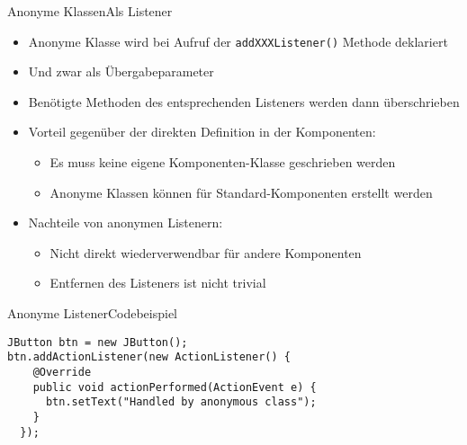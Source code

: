 \begin{frame}{Anonyme Klassen}{Als Listener}
    \begin{itemize}
        \item Anonyme Klasse wird bei Aufruf der \texttt{addXXXListener()} Methode deklariert
        \item Und zwar als Übergabeparameter
        \item Benötigte Methoden des entsprechenden Listeners werden dann überschrieben
        \item Vorteil gegenüber der direkten Definition in der Komponenten:
        \begin{itemize}
            \item Es muss keine eigene Komponenten-Klasse geschrieben werden
            \item Anonyme Klassen können für Standard-Komponenten erstellt werden
        \end{itemize}
        \item Nachteile von anonymen Listenern:
        \begin{itemize}
            \item Nicht direkt wiederverwendbar für andere Komponenten
            \item Entfernen des Listeners ist nicht trivial
        \end{itemize}
    \end{itemize}
\end{frame}

\begin{frame}[fragile]{Anonyme Listener}{Codebeispiel}
\lstset{style=java}
\begin{lstlisting}
JButton btn = new JButton();
btn.addActionListener(new ActionListener() {
    @Override
    public void actionPerformed(ActionEvent e) {
      btn.setText("Handled by anonymous class");
    }
  });
\end{lstlisting}
\end{frame}

